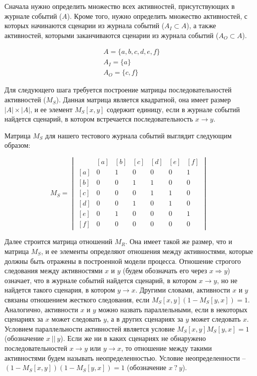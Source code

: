 \documentclass[
11pt,%
tightenlines,%
twoside,%
onecolumn,%
nofloats,%
nobibnotes,%
nofootinbib,%
superscriptaddress,%
noshowpacs,%
centertags]%
{revtex4}
\begin{document}
Сначала нужно определить множество всех активностей, присутствующих в журнале событий ($A$).
Кроме того, нужно определить множество активностей, с которых начинаются сценарии из журнала событий ($A_I \subset A$), а также активностей, которыми заканчиваются сценарии из журнала событий ($A_O \subset A$).

\begin{equation}
\begin{aligned}
&A = \{a, b, c, d, e, f\} \\
&A_I = \{a\} \\
&A_O = \{c, f\}
\end{aligned}
\end{equation}

Для следующего шага требуется построение матрицы последовательностей активностей ($M_S$).
Данная матрица является квадратной, она имеет размер $|A| \times |A|$, и ее элемент $M_S[x, y]$ содержит единицу, если в журнале событий найдется сценарий, в котором встречается последовательность $x \rightarrow y$.

Матрица $M_S$ для нашего тестового журнала событий выглядит следующим образом:

\begin{equation}
M_S = \begin{vmatrix}
\ & [a] & [b] & [c] & [d] & [e] & [f] \\
[a] & 0 & 1 & 0 & 0 & 0 & 1 \\ 
[b] & 0 & 0 & 1 & 1 & 0 & 0 \\
[c] & 0 & 0 & 0 & 1 & 1 & 0 \\
[d] & 0 & 0 & 1 & 0 & 1 & 0 \\
[e] & 0 & 1 & 0 & 0 & 0 & 1 \\
[f] & 0 & 0 & 0 & 0 & 0 & 0
\end{vmatrix}
\end{equation}

Далее строится матрица отношений $M_R$.
Она имеет такой же размер, что и матрица $M_S$, и ее элементы определяют отношения между активностями, которые должны быть отражены в построенной модели процесса.
Отношение строгого следования между активностями $x$ и $y$ (будем обозначать его через $x \Rightarrow y$) означает, что в журнале событий найдется сценарий, в котором $x \rightarrow y$, но не найдется такого сценария, в котором $y \rightarrow x$.
Другими словами, активности $x$ и $y$ связаны отношением жесткого следования, если $M_S[x, y](1 - M_S[y, x]) = 1$.
Аналогично, активности $x$ и $y$ можно назвать параллельными, если в некоторых сценариях за $x$ может следовать $y$, а в других сценариях за $y$ может следовать $x$.
Условием параллельности активностей является условие $M_S[x, y]M_S[y, x] = 1$ (обозначение $x \ || \ y$).
Если же ни в каких сценариях не обнаружено последовательностей $x \rightarrow y$ или $y \rightarrow x$, то отношение между такими активностями будем называть неопределенностью.
Условие неопределенности -- $(1 - M_S[x, y])(1 - M_S[y, x]) = 1$ (обозначение $x \ ? \ y$).
\end{document}
